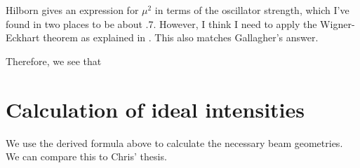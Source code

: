 %

Hilborn gives an expression for $\mu^2$ in terms of the oscillator strength, which I've found in two places \cite{safronovaTheory} \cite{NISTasd} to be about .7. However, I think I need to apply the Wigner-Eckhart theorem as explained in \cite{demilleBudkerKimball}. This also matches Gallagher's answer. 

Therefore, we see that 






  \section{Calculation of ideal intensities}

We use the derived formula above to calculate the necessary beam geometries. We can compare this to Chris' thesis. 


